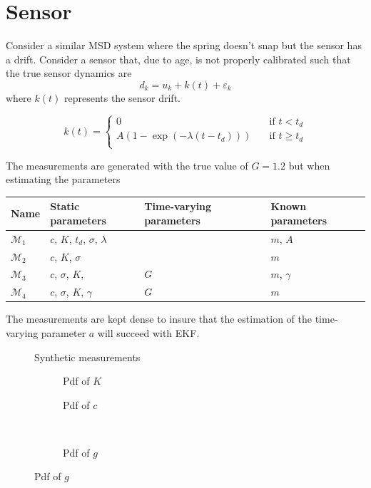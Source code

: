 \documentclass[]{elsarticle}
\begin{document}
\section{Sensor}

Consider a similar MSD system where the spring doesn't snap but the sensor has a drift. Consider a sensor that, due to age, is not properly calibrated such that the true sensor dynamics are
\begin{equation}
d_k = u_k + k(t) + \varepsilon_k
\end{equation} where $k(t)$ represents the sensor drift. 

\begin{equation}
k(t) = \begin{cases}
       0 &\quad \text{if } t < t_d \\
       A(1-\exp(-\lambda (t - t_d))) &\quad \text{if } t \geq t_d \\
     \end{cases}
\end{equation}


The measurements are generated with the true value of $G = 1.2$ but when estimating the parameters 
\begin{table}[!htb]
\begin{tabular}{l|lll}
\hline
Name & Static parameters & Time-varying parameters & Known parameters   \\
\hline
$\mathcal{M}_1$ & $c$, $K$, $t_d$, $\sigma$, $\lambda$ &  & $m$, $A$   \\
$\mathcal{M}_2$ & $c$, $K$, $\sigma$ &  & $m$   \\
$\mathcal{M}_3$ & $c$, $\sigma$, $K$, & $G$ & $m$, $\gamma$ \\
$\mathcal{M}_4$ & $c$, $\sigma$, $K$, $\gamma$ & $G$ & $m$  \\
\hline
\end{tabular}
\end{table}

The measurements are kept dense to insure that the estimation of the time-varying parameter $a$ will succeed with EKF.
\begin{figure}[!htb]
\centering
\caption{Synthetic measurements}
\label{fig:data}
\end{figure}


\begin{figure}[!htb]
\centering
\begin{subfigure}{.49\textwidth}
\caption{Pdf of $K$}
\end{subfigure}
\begin{subfigure}{.49\textwidth}
\centering
\caption{Pdf of $c$}
\label{fig:s1c}
\end{subfigure}\\
\begin{subfigure}{.49\textwidth}
\centering
\caption{Pdf of $g$}
\label{fig:s1d}
\end{subfigure}
\end{figure}
\end{document}
